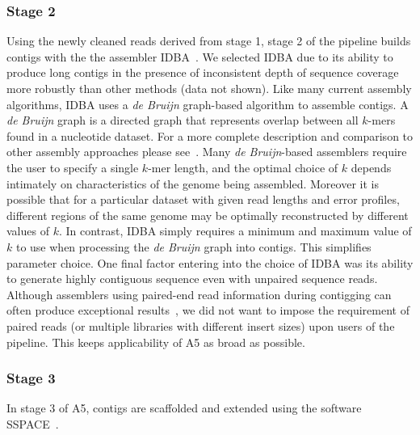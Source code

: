 \documentclass{bioinfo}
\begin{document}
\begin{methods}
\subsubsection{Stage 2}
Using the newly cleaned reads derived from stage 1, stage 2 of the pipeline builds contigs
with the the assembler IDBA~\citep{Peng2010}. We selected IDBA due 
to its ability to produce long contigs in the presence of inconsistent depth of sequence coverage more robustly than other methods (data not shown).
Like many current assembly algorithms, IDBA uses a \emph{de Bruijn} graph-based algorithm to assemble contigs. A \emph{de Bruijn} graph is a directed graph 
that represents overlap between all $k$-mers found in a nucleotide dataset. For a more complete description and comparison to other assembly 
approaches please see~\citet{Pop2009}. Many \emph{de Bruijn}-based assemblers require the user to specify a single $k$-mer length, and the optimal 
choice of $k$ depends intimately on characteristics of the genome being assembled.  Moreover it is possible that for a particular dataset with given 
read lengths and error profiles, different regions of the same genome may be optimally reconstructed by different values of $k$. In contrast, IDBA
simply requires a minimum and maximum value of $k$ to use when processing the \emph{de Bruijn} graph into contigs. This simplifies parameter choice. 
One final factor entering into the choice of IDBA was its 
ability to generate highly contiguous sequence even with unpaired sequence reads. Although assemblers using paired-end read information during 
contigging can often produce exceptional results~\citep{Gnerre2011, SASSY}, we did not want to impose the requirement of paired reads (or multiple
libraries with different insert sizes) upon users of the pipeline. This keeps applicability of A5 as broad as possible.

\subsubsection{Stage 3}
In stage 3 of A5, contigs are scaffolded and extended using the software SSPACE~\citep{Boetzer2011}. 


\end{methods}
\end{document}
